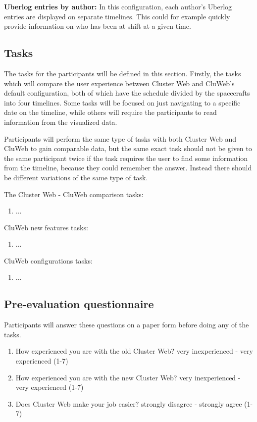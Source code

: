 \textbf{Uberlog entries by author:} In this configuration, each author's Uberlog entries are displayed on separate timelines. This could for example quickly provide information on who has been at shift at a given time.

\subsection{Tasks} \label{tasks_section}
The tasks for the participants will be defined in this section. Firstly, the tasks which will compare the user experience between Cluster Web and CluWeb's default configuration, both of which have the schedule divided by the spacecrafts into four timelines. Some tasks will be focused on just navigating to a specific date on the timeline, while others will require the participants to read information from the visualized data.

Participants will perform the same type of tasks with both Cluster Web and CluWeb to gain comparable data, but the same exact task should not be given to the same participant twice if the task requires the user to find some information from the timeline, because they could remember the answer. Instead there should be different variations of the same type of task.

The Cluster Web - CluWeb comparison tasks:
\begin{enumerate}
\item ...
\end{enumerate}

CluWeb new features tasks:
\begin{enumerate}
\item ...
\end{enumerate}

CluWeb configurations tasks:
\begin{enumerate}
\item ...
\end{enumerate}

\subsection{Pre-evaluation questionnaire} \label{pre-evaluation}
Participants will answer these questions on a paper form before doing any of the tasks.
\begin{enumerate}
\item How experienced you are with the old Cluster Web? very inexperienced - very experienced (1-7)
\item How experienced you are with the new Cluster Web? very inexperienced - very experienced (1-7)
\item Does Cluster Web make your job easier? strongly disagree - strongly agree (1-7)
\end{enumerate}

